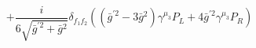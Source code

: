 %
\begin{dmath*}
%
  +  \frac{i}{6 \sqrt{{\bar g}^{\prime 2} + {\bar g}{}^2}}\delta_{f_1 f_2}  \left(\left({\bar g}^{\prime 2} - 3 {\bar g}{}^2\right) \gamma^{\mu_3} P_L + 4 {\bar g}^{\prime 2} \gamma^{\mu_3} P_R\right)
%
\end{dmath*}
%
